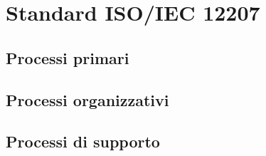 \appendix

\section{Standard ISO/IEC 12207} \label{section:ISO_IEC_12207}

\subsection{Processi primari} \label{subsection:processi_primari}
\subsection{Processi organizzativi} \label{subsection:processi_organizzativi}
\subsection{Processi di supporto} \label{subsection:processi_supporto}
